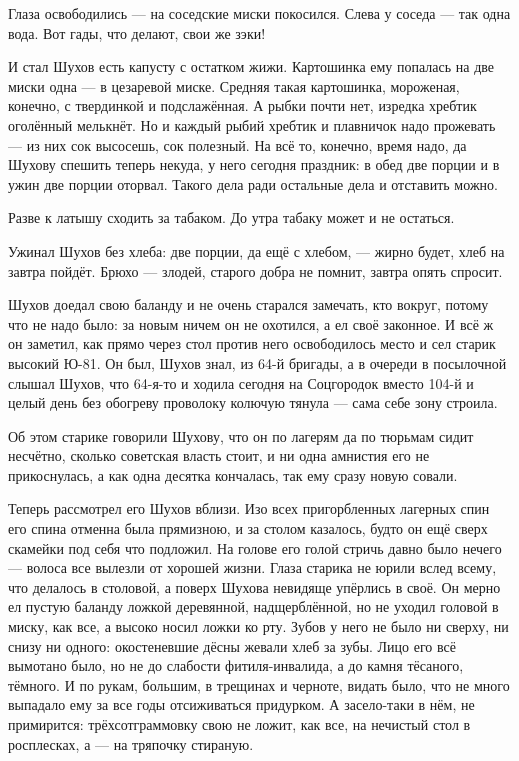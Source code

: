 Глаза освободились --- на соседские миски покосился. Слева у соседа --- так одна вода. Вот гады, 
что делают, свои же зэки!

И стал Шухов есть капусту с остатком жижи. Картошинка ему попалась на две миски одна --- в 
цезаревой миске. Средняя такая картошинка, мороженая, конечно, с твердинкой и подслажённая. 
А рыбки почти нет, изредка хребтик оголённый мелькнёт. Но и каждый рыбий хребтик и плавничок 
надо прожевать --- из них сок высосешь, сок полезный. На всё то, конечно, время надо, да Шухову 
спешить теперь некуда, у него сегодня праздник: в обед две порции и в ужин две порции оторвал. 
Такого дела ради остальные дела и отставить можно.

Разве к латышу сходить за табаком. До утра табаку может и не остаться.

Ужинал Шухов без хлеба: две порции, да ещё с хлебом, --- жирно будет, хлеб на завтра пойдёт. 
Брюхо --- злодей, старого добра не помнит, завтра опять спросит.

Шухов доедал свою баланду и не очень старался замечать, кто вокруг, потому что не надо было: 
за новым ничем он не охотился, а ел своё законное. И всё ж он заметил, как прямо через стол 
против него освободилось место и сел старик высокий Ю-81. Он был, Шухов знал, из 64-й бригады, а в 
очереди в посылочной слышал Шухов, что 64-я-то и ходила сегодня на Соцгородок вместо 104-й и 
целый день без обогреву проволоку колючую тянула --- сама себе зону строила.

Об этом старике говорили Шухову, что он по лагерям да по тюрьмам сидит несчётно, сколько 
советская власть стоит, и ни одна амнистия его не прикоснулась, а как одна десятка кончалась, 
так ему сразу новую совали.

Теперь рассмотрел его Шухов вблизи. Изо всех пригорбленных лагерных спин его спина отменна 
была прямизною, и за столом казалось, будто он ещё сверх скамейки под себя что подложил. На 
голове его голой стричь давно было нечего --- волоса все вылезли от хорошей жизни. Глаза 
старика не юрили вслед всему, что делалось в столовой, а поверх Шухова невидяще упёрлись в 
своё. Он мерно ел пустую баланду ложкой деревянной, надщерблённой, но не уходил головой в 
миску, как все, а высоко носил ложки ко рту. Зубов у него не было ни сверху, ни снизу ни одного: 
окостеневшие дёсны жевали хлеб за зубы. Лицо его всё вымотано было, но не до слабости 
фитиля-инвалида, а до камня тёсаного, тёмного. И по рукам, большим, в трещинах и черноте, 
видать было, что не много выпадало ему за все годы отсиживаться придурком. А засело-таки в 
нём, не примирится: трёхсотграммовку свою не ложит, как все, на нечистый стол в росплесках, а 
--- на тряпочку стираную.

